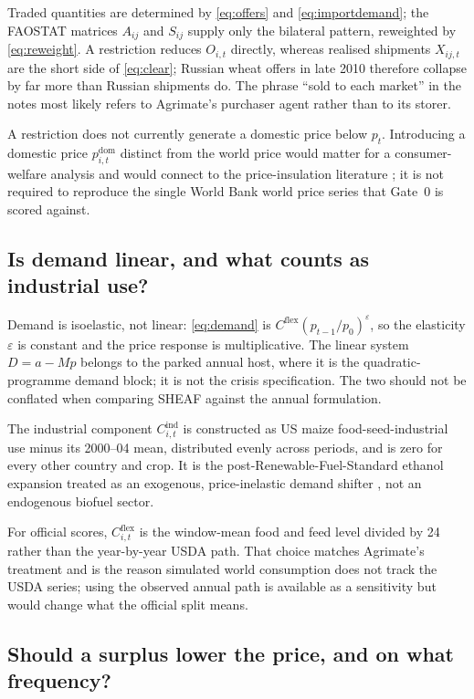 Traded quantities are determined by \eqref{eq:offers} and
\eqref{eq:importdemand}; the FAOSTAT matrices \(A_{ij}\) and \(S_{ij}\)
supply only the bilateral pattern, reweighted by \eqref{eq:reweight}. A
restriction reduces \(O_{i,t}\) directly, whereas realised shipments
\(X_{ij,t}\) are the short side of \eqref{eq:clear}; Russian wheat offers
in late 2010 therefore collapse by far more than Russian shipments do.
The phrase ``sold to each market'' in the notes most likely refers to
Agrimate's purchaser agent rather than to its storer.

A restriction does not currently generate a domestic price below \(p_t\).
Introducing a domestic price \(p^{\mathrm{dom}}_{i,t}\) distinct from the
world price would matter for a consumer-welfare analysis and would connect
to the price-insulation literature \citep{martin2012}; it is not required
to reproduce the single World Bank world price series that Gate~0 is
scored against.

\subsection{Is demand linear, and what counts as industrial use?}

Demand is isoelastic, not linear: \eqref{eq:demand} is
\(C^{\mathrm{flex}}(p_{t-1}/p_0)^{\varepsilon}\), so the elasticity
\(\varepsilon\) is constant and the price response is multiplicative. The
linear system \(D=a-Mp\) belongs to the parked annual host, where it is the
quadratic-programme demand block; it is not the crisis specification. The
two should not be conflated when comparing SHEAF against the annual
formulation.

The industrial component \(C^{\mathrm{ind}}_{i,t}\) is constructed as US
maize food-seed-industrial use minus its 2000--04 mean, distributed evenly
across periods, and is zero for every other country and crop. It is the
post-Renewable-Fuel-Standard ethanol expansion treated as an exogenous,
price-inelastic demand shifter \citep{rfs2005,abbott2011,roberts2013}, not
an endogenous biofuel sector.

For official scores, \(C^{\mathrm{flex}}_{i,t}\) is the window-mean food
and feed level divided by 24 rather than the year-by-year USDA path. That
choice matches Agrimate's treatment and is the reason simulated world
consumption does not track the USDA series; using the observed annual path
is available as a sensitivity but would change what the official split
means.

\subsection{Should a surplus lower the price, and on what frequency?}

